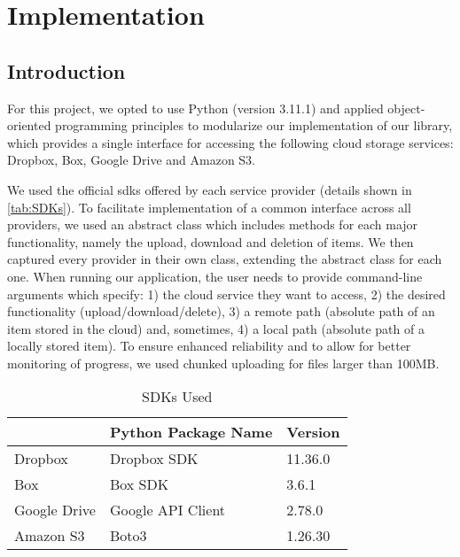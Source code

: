 \chapter{Implementation}\label{ch:implementation}

\section{Introduction}
For this project, we opted to use Python (version 3.11.1) and applied object-oriented programming principles to modularize our implementation of our library, which provides a single interface for accessing the following cloud storage services: Dropbox, Box, Google Drive and Amazon S3.

We used the official \acp{sdk} offered by each service provider (details shown in \autoref{tab:SDKs}). To facilitate implementation of a common interface across all providers, we used an abstract class which includes methods for each major functionality, namely the upload, download and deletion of items. We then captured every provider in their own class, extending the abstract class for each one. When running our application, the user needs to provide command-line arguments which specify: 1) the cloud service they want to access, 2) the desired functionality (upload/download/delete), 3) a remote path (absolute path of an item stored in the cloud) and, sometimes, 4) a local path (absolute path of a locally stored item). To ensure enhanced reliability and to allow for better monitoring of progress, we used chunked uploading for  files larger than 100MB.


\begin{table}[!h]
    \centering
     \caption{SDKs Used} 
      \label{tab:SDKs}
    \begin{tabular}{|l|l|l|}
        \hline
        \rowcolor[HTML]{EFEFEF}
        \multicolumn{1}{|c|}{\cellcolor[HTML]{EFEFEF}\textbf{Cloud Storage Service}} &
        \multicolumn{1}{c|}{\cellcolor[HTML]{EFEFEF}\textbf{Python Package Name}} &
        {\color[HTML]{333333} \textbf{Version}} \\ \hline
        Dropbox                & Dropbox SDK       & 11.36.0 \\ \hline
        Box                    & Box SDK           & 3.6.1   \\ \hline
        Google Drive           & Google API Client & 2.78.0  \\ \hline
        Amazon S3              & Boto3             & 1.26.30 \\ \hline
    \end{tabular}

\end{table}


